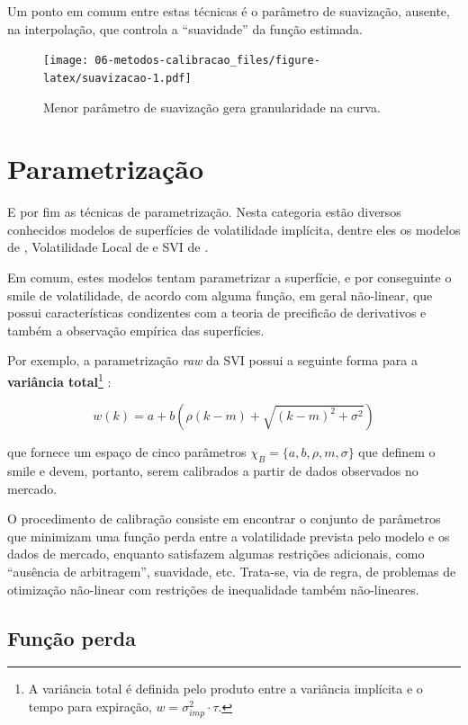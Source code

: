 \documentclass[]{book}
\let\rmarkdownfootnote\footnote%
\def\footnote{\protect\rmarkdownfootnote}
\begin{document}
Um ponto em comum entre estas técnicas é o parâmetro de suavização,
ausente, na interpolação, que controla a ``suavidade'' da função
estimada.

\begin{figure}
\centering
\texttt{[image: 06-metodos-calibracao\_files/figure-latex/suavizacao-1.pdf]}
\caption{\label{fig:suavizacao}Menor parâmetro de suavização gera
granularidade na curva.}
\end{figure}

\section{Parametrização}\label{parametrizacao}

E por fim as técnicas de parametrização. Nesta categoria estão diversos
conhecidos modelos de superfícies de volatilidade implícita, dentre eles
os modelos de \citet{Heston1993}, Volatilidade Local de
\citet{Dupire1994} e SVI de \citet{Gatheral2004}.

Em comum, estes modelos tentam parametrizar a superfície, e por
conseguinte o smile de volatilidade, de acordo com alguma função, em
geral não-linear, que possui características condizentes com a teoria de
precificão de derivativos e também a observação empírica das
superfícies.

Por exemplo, a parametrização \emph{raw} da SVI possui a seguinte forma
para a \textbf{variância total}\footnote{A variância total é definida
  pelo produto entre a variância implícita e o tempo para expiração,
  \(w=\sigma^2_{imp}\cdot\tau\).} :

\[ w(k) = a + b\left(\rho(k-m)+\sqrt{(k-m)^2 + \sigma^2}\right)\]

que fornece um espaço de cinco parâmetros
\(\chi_B=\{a, b, \rho, m, \sigma\}\) que definem o smile e devem,
portanto, serem calibrados a partir de dados observados no mercado.

O procedimento de calibração consiste em encontrar o conjunto de
parâmetros que minimizam uma função perda entre a volatilidade prevista
pelo modelo e os dados de mercado, enquanto satisfazem algumas
restrições adicionais, como ``ausência de arbitragem'', suavidade, etc.
Trata-se, via de regra, de problemas de otimização não-linear com
restrições de inequalidade também não-lineares.

\subsection{Função perda}\label{funcao-perda}
\end{document}
